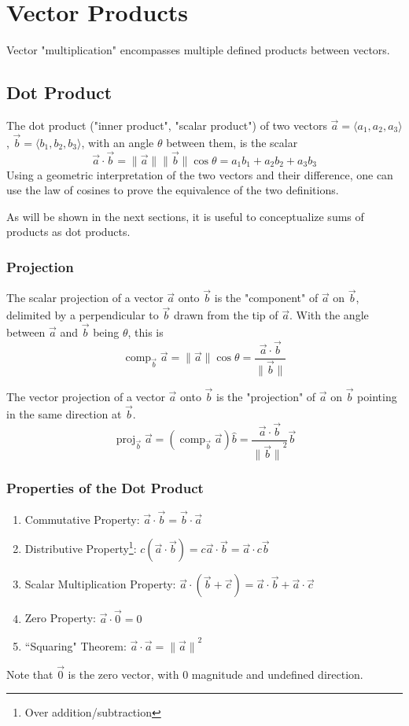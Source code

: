 \documentclass{article}
\DeclareMathOperator{\comp}{comp}
\DeclareMathOperator{\proj}{proj}
\newcommand{\vect}[1]{\ensuremath{\overrightarrow{#1}}}
\newcommand{\magnitude}[1]{\ensuremath{\lVert #1 \rVert}}
\newcommand{\magvect}[1]{\magnitude{\vect{#1}}}
\begin{document}
\section{Vector Products}
Vector "multiplication" encompasses multiple defined products between vectors.

\subsection{Dot Product}
The dot product ("inner product", "scalar product") of two vectors $\vect{a} = \langle a_1, a_2, a_3 \rangle$, $\vect{b} = \langle b_1, b_2, b_3 \rangle$, with an angle $\theta$ between them, is the scalar
$$\vect{a} \cdot \vect{b} = \magvect{a}\magvect{b}\cos{\theta} = a_1b_1 + a_2b_2 + a_3b_3$$
Using a geometric interpretation of the two vectors and their difference, one can use the law of cosines to prove the equivalence of the two definitions.

As will be shown in the next sections, it is useful to conceptualize sums of products as dot products.

\subsubsection{Projection}
The scalar projection of a vector \vect{a} onto \vect{b} is the "component" of \vect{a} on \vect{b}, delimited by a perpendicular to \vect{b} drawn from the tip of \vect{a}. With the angle between \vect{a} and \vect{b} being $\theta$, this is
$$\comp_{\vect{b}} \vect{a} = \magvect{a}\cos{\theta} = \frac{\vect{a} \cdot \vect{b}}{\magvect{b}}$$

The vector projection of a vector \vect{a} onto \vect{b} is the "projection" of \vect{a} on \vect{b} pointing in the same direction at \vect{b}.
$$\proj_{\vect{b}}\vect{a} = \left(\comp_{\vect{b}}\vect{a}\right)\hat{b} = \frac{\vect{a} \cdot \vect{b}}{\magvect{b}^2} \vect{b}$$

\subsubsection{Properties of the Dot Product}
\begin{enumerate}
    \item Commutative Property: $\vect{a} \cdot \vect{b} = \vect{b} \cdot \vect{a}$
    \item Distributive Property\footnote{Over addition/subtraction}: $c\left(\vect{a} \cdot \vect{b}\right) = c\vect{a} \cdot \vect{b} = \vect{a} \cdot c\vect{b}$
    \item Scalar Multiplication Property: $\vect{a} \cdot \left(\vect{b} + \vect{c}\right) = \vect{a} \cdot \vect{b} + \vect{a} \cdot \vect{c}$
    \item Zero Property: $\vect{a} \cdot \vect{0} = 0$
    \item ``Squaring" Theorem: $\vect{a} \cdot \vect{a} = \magvect{a}^2$
\end{enumerate}
Note that $\vect{0}$ is the zero vector, with $0$ magnitude and undefined direction.
\end{document}
